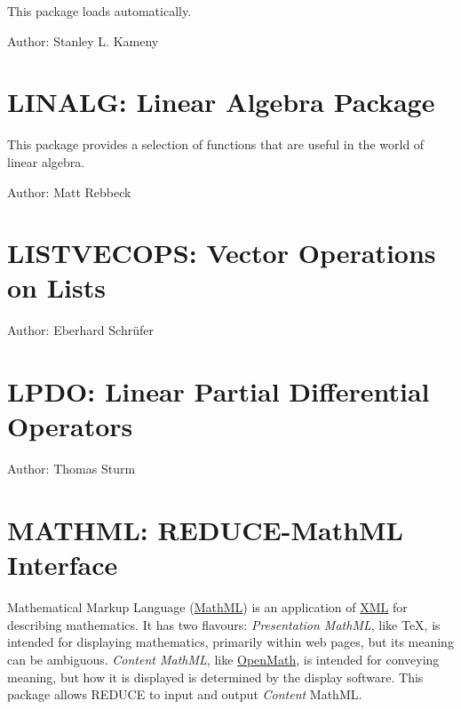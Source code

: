This package loads automatically.

Author: Stanley L. Kameny


\fi

\newpage

\section{LINALG: Linear Algebra Package}
\label{LINALG}

This package provides a selection of functions that are useful
in the world of linear algebra.

Author: Matt Rebbeck



\newpage

\section{LISTVECOPS: Vector Operations on Lists}
\label{LISTVECOPS}

Author: Eberhard Schr\"{u}fer



\newpage

\section{LPDO: Linear Partial Differential Operators}
\label{LPDO}

Author: Thomas Sturm



\newpage

\section{MATHML: REDUCE-MathML Interface}

Mathematical Markup Language (\href{https://www.w3.org/Math/}{MathML})
is an application of \href{https://www.w3.org/XML/}{XML} for
describing mathematics.  It has two flavours: \emph{Presentation
MathML}, like \TeX, is intended for displaying mathematics, primarily
within web pages, but its meaning can be ambiguous.  \emph{Content
MathML}, like \href{https://openmath.org/}{OpenMath}, is intended for
conveying meaning, but how it is displayed is determined by the
display software.  This package allows REDUCE to input and output
\emph{Content} MathML.

